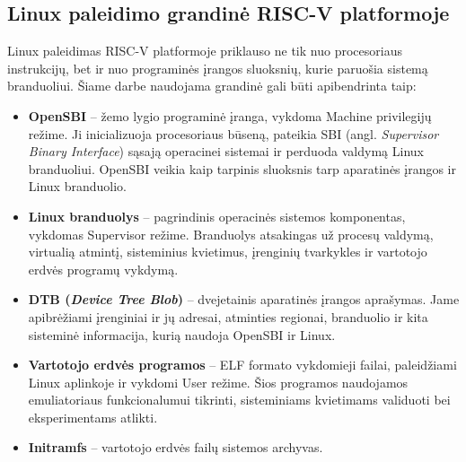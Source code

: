 \subsection{Linux paleidimo grandinė RISC-V platformoje}
\label{subsec:linux-paleidimo-grandine}

Linux paleidimas RISC-V platformoje priklauso ne tik nuo procesoriaus instrukcijų, bet ir nuo programinės įrangos sluoksnių, kurie paruošia sistemą branduoliui. Šiame darbe naudojama grandinė gali būti apibendrinta taip:

\begin{itemize}
    \item \textbf{OpenSBI} -- žemo lygio programinė įranga, vykdoma Machine privilegijų režime. Ji inicializuoja procesoriaus būseną, pateikia SBI (angl. \textit{Supervisor Binary Interface}) sąsają operacinei sistemai ir perduoda valdymą Linux branduoliui. OpenSBI veikia kaip tarpinis sluoksnis tarp aparatinės įrangos ir Linux branduolio.

    \item \textbf{Linux branduolys} -- pagrindinis operacinės sistemos komponentas, vykdomas Supervisor režime. Branduolys atsakingas už procesų valdymą, virtualią atmintį, sisteminius kvietimus, įrenginių tvarkykles ir vartotojo erdvės programų vykdymą.

    \item \textbf{DTB (\textit{Device Tree Blob})} -- dvejetainis aparatinės įrangos aprašymas. Jame apibrėžiami įrenginiai ir jų adresai, atminties regionai, branduolio ir kita sisteminė informacija, kurią naudoja OpenSBI ir Linux.

    \item \textbf{Vartotojo erdvės programos} -- ELF formato vykdomieji failai, paleidžiami Linux aplinkoje ir vykdomi User režime. Šios programos naudojamos emuliatoriaus funkcionalumui tikrinti, sisteminiams kvietimams validuoti bei eksperimentams atlikti.

    \item \textbf{Initramfs} -- vartotojo erdvės failų sistemos archyvas.

\end{itemize}
